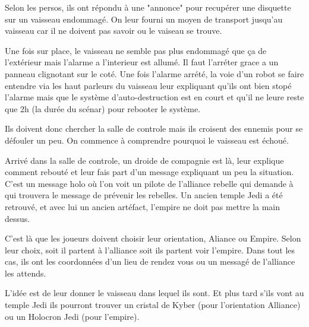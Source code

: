 Selon les persos, ils ont répondu à une "annonce" pour recupérer une disquette sur un vaisseau endommagé. On leur fourni un moyen de transport jusqu'au vaisseau car il ne doivent pas savoir ou le vaiseau se trouve.

Une fois sur place, le vaisseau ne semble pas plus endommagé que ça de l'extérieur mais l'alarme a l'interieur est allumé. Il faut l'arréter grace a un panneau clignotant sur le coté. Une fois l'alarme arrété, la voie d'un robot se faire entendre via les haut parleurs du vaisseau leur expliquant qu'ils ont bien stopé l'alarme mais que le système d'auto-destruction est en court et qu'il ne leure reste que 2h (la durée du scénar) pour rebooter le système.

Ils doivent donc chercher la salle de controle mais ils croisent des ennemis pour se défouler un peu. On commence à comprendre pourquoi le vaisseau est échoué.

Arrivé dans la salle de controle, un droide de compagnie est là, leur explique comment rebouté et leur fais part d'un message expliquant un peu la situation. C'est un message holo où l'on voit un pilote de l'alliance rebelle qui demande à qui trouvera le message de prévenir les rebelles. Un ancien temple Jedi a été retrouvé, et avec lui un ancien artéfact, l'empire ne doit pas mettre la main dessus.

C'est là que les joueurs doivent choisir leur orientation, Aliance ou Empire. Selon leur choix, soit il partent à l'alliance soit ils partent voir l'empire. Dans tout les cas, ils ont les coordonnées d'un lieu de rendez vous ou un messagé de l'alliance les attends.

L'idée est de leur donner le vaisseau dans lequel ils sont. Et plus tard s'ils vont au temple Jedi ils pourront trouver un cristal de Kyber (pour l'orientation Alliance) ou un Holocron Jedi (pour l'empire).